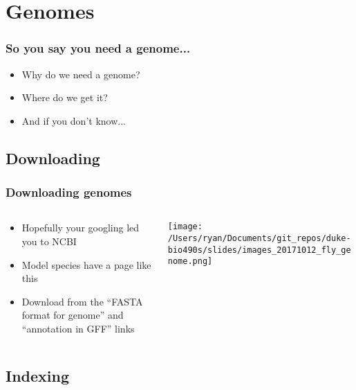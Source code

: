 \documentclass[14pt,handout]{beamer}
\begin{document}
\section{Genomes}

\begin{frame}
\frametitle{So you say you need a genome...}
\begin{itemize}
	\large
	\item<+-> Why do we need a genome?
	\item<+-> Where do we get it?
	\item<+-> And if you don't know...
\end{itemize}
\end{frame}

\subsection{Downloading}

\begin{frame}
\frametitle{Downloading genomes}
\begin{columns}
	\begin{column}{0.3\textwidth}
		\begin{itemize}
			\footnotesize
			\item<+-> Hopefully your googling led you to NCBI
			\item<+-> Model species have a page like this
			\item<+-> Download from the ``FASTA format for genome'' and ``annotation in GFF'' links
		\end{itemize}
		\end{column}
	\begin{column}{0.7\textwidth}
		\begin{center}
     		\texttt{[image: /Users/ryan/Documents/git\_repos/duke-bio490s/slides/images\_20171012\_fly\_genome.png]}
     	\end{center}
	\end{column}
\end{columns}
\end{frame}

\subsection{Indexing}
\end{document}
